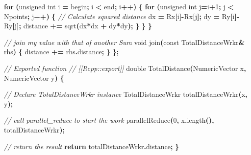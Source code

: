 \documentclass[
  12pt,
  american,
  a4paper,
  extrafontsizes,onecolumn,openright
  ]{memoir}
\newenvironment{Shaded}{\begin{snugshade}}{\end{snugshade}}
\newcommand{\AttributeTok}[1]{\textcolor[rgb]{0.13,0.29,0.53}{#1}}
\newcommand{\CommentTok}[1]{\textcolor[rgb]{0.56,0.35,0.01}{\textit{#1}}}
\newcommand{\ControlFlowTok}[1]{\textcolor[rgb]{0.13,0.29,0.53}{\textbf{#1}}}
\newcommand{\DataTypeTok}[1]{\textcolor[rgb]{0.13,0.29,0.53}{#1}}
\newcommand{\DecValTok}[1]{\textcolor[rgb]{0.00,0.00,0.81}{#1}}
\newcommand{\NormalTok}[1]{#1}
\newcommand{\OperatorTok}[1]{\textcolor[rgb]{0.81,0.36,0.00}{\textbf{#1}}}
\begin{document}
\begin{Shaded}
\begin{Highlighting}[]
    \ControlFlowTok{for} \OperatorTok{(}\DataTypeTok{unsigned} \DataTypeTok{int}\NormalTok{ i }\OperatorTok{=}\NormalTok{ begin}\OperatorTok{;}\NormalTok{ i }\OperatorTok{\textless{}}\NormalTok{ end}\OperatorTok{;}\NormalTok{ i}\OperatorTok{++)} \OperatorTok{\{}
      \ControlFlowTok{for} \OperatorTok{(}\DataTypeTok{unsigned} \DataTypeTok{int}\NormalTok{ j}\OperatorTok{=}\NormalTok{i}\OperatorTok{+}\DecValTok{1}\OperatorTok{;}\NormalTok{ j }\OperatorTok{\textless{}}\NormalTok{ Npoints}\OperatorTok{;}\NormalTok{ j}\OperatorTok{++)} \OperatorTok{\{}
          \CommentTok{// Calculate squared distance}
\NormalTok{          dx }\OperatorTok{=}\NormalTok{ Rx}\OperatorTok{[}\NormalTok{i}\OperatorTok{]{-}}\NormalTok{Rx}\OperatorTok{[}\NormalTok{j}\OperatorTok{];}
\NormalTok{          dy }\OperatorTok{=}\NormalTok{ Ry}\OperatorTok{[}\NormalTok{i}\OperatorTok{]{-}}\NormalTok{Ry}\OperatorTok{[}\NormalTok{j}\OperatorTok{];}
\NormalTok{          distance }\OperatorTok{+=}\NormalTok{ sqrt}\OperatorTok{(}\NormalTok{dx}\OperatorTok{*}\NormalTok{dx }\OperatorTok{+}\NormalTok{ dy}\OperatorTok{*}\NormalTok{dy}\OperatorTok{);}
      \OperatorTok{\}}
    \OperatorTok{\}}
  \OperatorTok{\}}

  \CommentTok{// join my value with that of another Sum}
  \DataTypeTok{void}\NormalTok{ join}\OperatorTok{(}\AttributeTok{const}\NormalTok{ TotalDistanceWrkr}\OperatorTok{\&}\NormalTok{ rhs}\OperatorTok{)} \OperatorTok{\{} 
\NormalTok{    distance }\OperatorTok{+=}\NormalTok{ rhs}\OperatorTok{.}\NormalTok{distance}\OperatorTok{;} 
  \OperatorTok{\}}
\OperatorTok{\};}


\CommentTok{// Exported function}
\CommentTok{// [[Rcpp::export]]}
\DataTypeTok{double}\NormalTok{ TotalDistance}\OperatorTok{(}\NormalTok{NumericVector x}\OperatorTok{,}\NormalTok{ NumericVector y}\OperatorTok{)} \OperatorTok{\{}
  
  \CommentTok{// Declare TotalDistanceWrkr instance}
\NormalTok{  TotalDistanceWrkr totalDistanceWrkr}\OperatorTok{(}\NormalTok{x}\OperatorTok{,}\NormalTok{ y}\OperatorTok{);}
  
  \CommentTok{// call parallel\_reduce to start the work}
\NormalTok{  parallelReduce}\OperatorTok{(}\DecValTok{0}\OperatorTok{,}\NormalTok{ x}\OperatorTok{.}\NormalTok{length}\OperatorTok{(),}\NormalTok{ totalDistanceWrkr}\OperatorTok{);}
  
  \CommentTok{// return the result}
  \ControlFlowTok{return}\NormalTok{ totalDistanceWrkr}\OperatorTok{.}\NormalTok{distance}\OperatorTok{;}
\OperatorTok{\}}
\end{Highlighting}
\end{Shaded}
\end{document}
